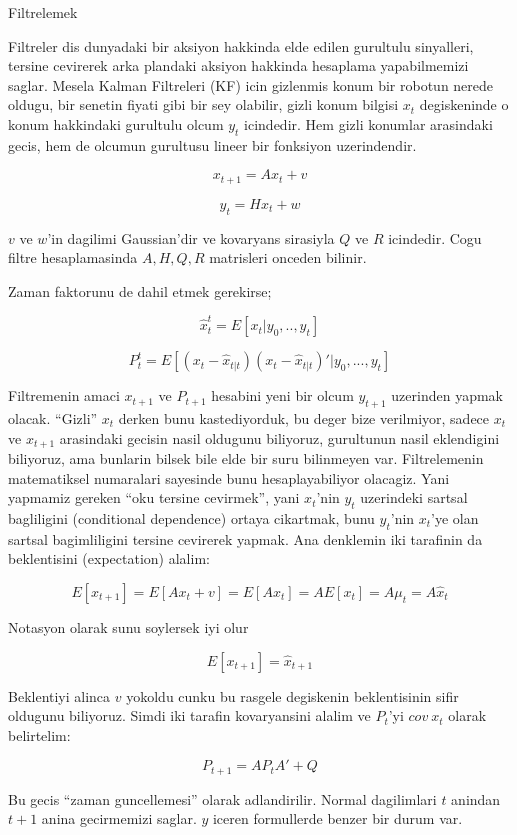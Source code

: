 \documentclass[12pt,fleqn]{article}\usepackage{../common}
\begin{document}
Filtrelemek

Filtreler dis dunyadaki bir aksiyon hakkinda elde edilen gurultulu
sinyalleri, tersine cevirerek arka plandaki aksiyon hakkinda hesaplama
yapabilmemizi saglar. Mesela Kalman Filtreleri (KF) icin gizlenmis konum
bir robotun nerede oldugu, bir senetin fiyati gibi bir sey olabilir, gizli
konum bilgisi $x_t$ degiskeninde o konum hakkindaki gurultulu olcum $y_t$
icindedir. Hem gizli konumlar arasindaki gecis, hem de olcumun gurultusu
lineer bir fonksiyon uzerindendir.

\[ x_{t+1} = Ax_t + v \]

\[ y_t = Hx_t + w \]

$v$ ve $w$'in dagilimi Gaussian'dir ve kovaryans sirasiyla $Q$ ve $R$
icindedir. Cogu filtre hesaplamasinda $A,H,Q,R$ matrisleri onceden bilinir.


Zaman faktorunu de dahil etmek gerekirse;

\[ \hat{x}_t^t = E[x_t|y_0,..,y_t] \]

\[ P_t^t = E[(x_t - \hat{x}_{t|t}) (x_t - \hat{x}_{t|t})'| y_0,...,y_t   ] \]

Filtremenin amaci $x_{t+1}$ ve $P_{t+1}$ hesabini yeni bir olcum $y_{t+1}$
uzerinden yapmak olacak. ``Gizli'' $x_t$ derken bunu kastediyorduk, bu
deger bize verilmiyor, sadece $x_t$ ve $x_{t+1}$ arasindaki gecisin nasil oldugunu
biliyoruz, gurultunun nasil eklendigini biliyoruz, ama bunlarin bilsek bile
elde bir suru bilinmeyen var. Filtrelemenin matematiksel numaralari
sayesinde bunu hesaplayabiliyor olacagiz.  Yani yapmamiz gereken ``oku
tersine cevirmek'', yani $x_t$'nin $y_t$ uzerindeki sartsal bagliligini
(conditional dependence) ortaya cikartmak, bunu $y_t$'nin $x_t$'ye olan sartsal
bagimliligini tersine cevirerek yapmak. Ana denklemin iki tarafinin da
beklentisini (expectation) alalim:

\[ E [x_{t+1}] = E [A x_{t} + v] = E [A x_{t}] = A E [x_{t}] = A \mu_t = A \hat{x}_t \]

Notasyon olarak sunu soylersek iyi olur

\[ E [x_{t+1}]  = \hat{x}_{t+1} \] 

Beklentiyi alinca $v$ yokoldu cunku bu rasgele degiskenin beklentisinin
sifir oldugunu biliyoruz. Simdi iki tarafin kovaryansini alalim ve $P_t$'yi
$cov \ x_t$ olarak belirtelim:

\[ P_{t+1} = AP_tA' + Q \]

Bu gecis ``zaman guncellemesi'' olarak adlandirilir. Normal dagilimlari $t$
anindan $t + 1$ anina gecirmemizi saglar. $y$ iceren formullerde benzer bir
durum var. 
\end{document}

